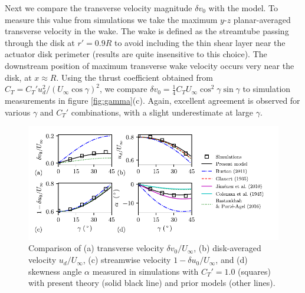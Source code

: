 Next we compare the transverse velocity magnitude $\delta v_0$ with the model. To measure this value from simulations we take the maximum $y$-$z$ planar-averaged transverse velocity in the wake. The wake is defined as the streamtube passing through the disk at $r' = 0.9R$ to avoid including the thin shear layer near the actuator disk perimeter (results are quite insensitive to this choice). The downstream position of maximum transverse wake velocity occurs very near the disk, at $x \approx R$. Using the thrust coefficient obtained from \mbox{$C_T = C_T' u_d^2/ (U_\infty \cos \gamma)^2$}, we compare $\delta v_0 = \frac{1}{4} C_T U_\infty \cos^2\gamma \sin \gamma$ to simulation measurements in figure \ref{fig:gamma}(c). Again, excellent agreement is observed for various $\gamma$ and $C_T'$ combinations, with a slight underestimate at large $\gamma$. 


\begin{figure}
\includegraphics[width=\textwidth]{./fig/steady-uniform-1.pdf}
\caption{\label{fig:steady-uniform}Comparison of (a) transverse velocity $\delta v_0/U_\infty$, (b) disk-averaged velocity $u_d/U_\infty$, (c) streamwise velocity $1 - \delta u_0/U_\infty$,  and  (d) skewness angle $\alpha$ measured in simulations with $C_T' = 1.0$ (squares) with present theory (solid black line) and prior models (other lines).}
\end{figure}

